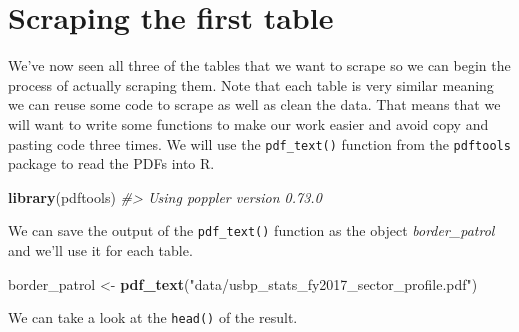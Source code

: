 \documentclass[
  12pt,
]{book}
\newenvironment{Shaded}{\begin{snugshade}}{\end{snugshade}}
\newcommand{\CommentTok}[1]{\textcolor[rgb]{0.37,0.37,0.37}{\textit{#1}}}
\newcommand{\KeywordTok}[1]{\textcolor[rgb]{0.27,0.27,0.27}{\textbf{#1}}}
\newcommand{\NormalTok}[1]{#1}
\newcommand{\StringTok}[1]{\textcolor[rgb]{0.5,0.5,0.5}{#1}}
\begin{document}
\hypertarget{scraping-the-first-table}{%
\section{Scraping the first table}\label{scraping-the-first-table}}

We've now seen all three of the tables that we want to scrape so we can begin the process of actually scraping them. Note that each table is very similar meaning we can reuse some code to scrape as well as clean the data. That means that we will want to write some functions to make our work easier and avoid copy and pasting code three times. We will use the \texttt{pdf\_text()} function from the \texttt{pdftools} package to read the PDFs into R.

\begin{Shaded}
\begin{Highlighting}[]
\KeywordTok{library}\NormalTok{(pdftools)}
\CommentTok{\#\textgreater{} Using poppler version 0.73.0}
\end{Highlighting}
\end{Shaded}

We can save the output of the \texttt{pdf\_text()} function as the object \emph{border\_patrol} and we'll use it for each table.

\begin{Shaded}
\begin{Highlighting}[]
\NormalTok{border\_patrol \textless{}{-}}\StringTok{ }\KeywordTok{pdf\_text}\NormalTok{(}\StringTok{"data/usbp\_stats\_fy2017\_sector\_profile.pdf"}\NormalTok{)}
\end{Highlighting}
\end{Shaded}

We can take a look at the \texttt{head()} of the result.
\end{document}
